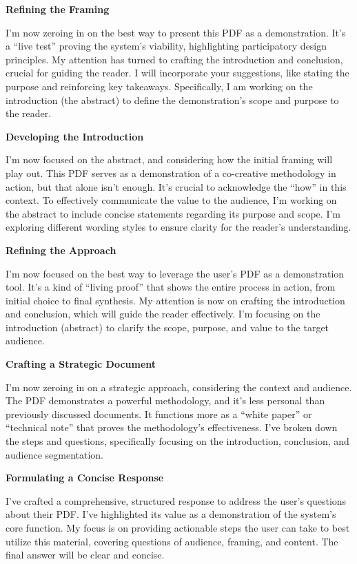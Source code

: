 \documentclass{article}
\begin{document}
\textbf{Refining the Framing}

I'm now zeroing in on the best way to present this PDF as a demonstration. It's a ``live test'' proving the system's viability, highlighting participatory design principles. My attention has turned to crafting the introduction and conclusion, crucial for guiding the reader. I will incorporate your suggestions, like stating the purpose and reinforcing key takeaways. Specifically, I am working on the introduction (the abstract) to define the demonstration's scope and purpose to the reader.

\textbf{Developing the Introduction}

I'm now focused on the abstract, and considering how the initial framing will play out. This PDF serves as a demonstration of a co-creative methodology in action, but that alone isn't enough. It's crucial to acknowledge the ``how'' in this context. To effectively communicate the value to the audience, I'm working on the abstract to include concise statements regarding its purpose and scope. I'm exploring different wording styles to ensure clarity for the reader's understanding.

\textbf{Refining the Approach}

I'm now focused on the best way to leverage the user's PDF as a demonstration tool. It's a kind of ``living proof'' that shows the entire process in action, from initial choice to final synthesis. My attention is now on crafting the introduction and conclusion, which will guide the reader effectively. I'm focusing on the introduction (abstract) to clarify the scope, purpose, and value to the target audience.

\textbf{Crafting a Strategic Document}

I'm now zeroing in on a strategic approach, considering the context and audience. The PDF demonstrates a powerful methodology, and it's less personal than previously discussed documents. It functions more as a ``white paper'' or ``technical note'' that proves the methodology's effectiveness. I've broken down the steps and questions, specifically focusing on the introduction, conclusion, and audience segmentation.

\textbf{Formulating a Concise Response}

I've crafted a comprehensive, structured response to address the user's questions about their PDF. I've highlighted its value as a demonstration of the system's core function. My focus is on providing actionable steps the user can take to best utilize this material, covering questions of audience, framing, and content. The final answer will be clear and concise.
\end{document}
